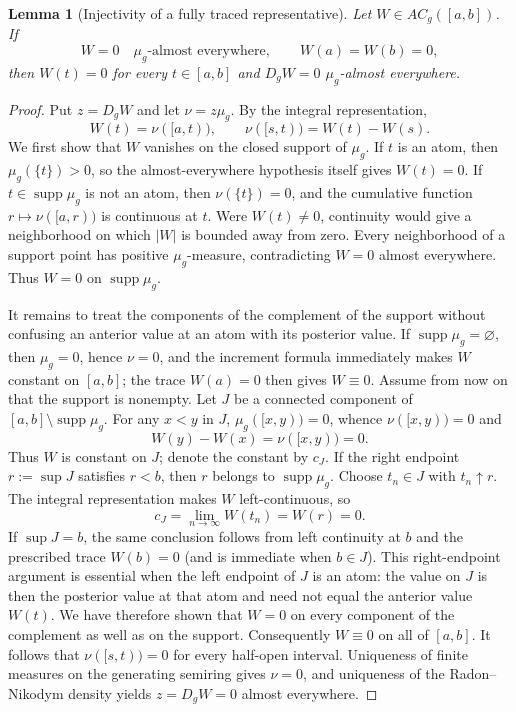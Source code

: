 \documentclass[preprint,12pt]{elsarticle}
\newenvironment{revision}{\begingroup\color{red}}{\endgroup}
\newenvironment{revision}{}{}
\newcommand{\newrev}[1]{{\color{red}#1}}
\newcommand{\newrev}[1]{#1}
\newtheorem{lemma}[theorem]{Lemma}
\theoremstyle{definition}
\theoremstyle{remark}
\begin{document}
\begin{revision}
\begin{lemma}[Injectivity of a fully traced representative]
\label{lem:traced-representative-injective}
Let \(W\in AC_g([a,b])\).  If
\[
 W=0\quad\mu_g\text{-almost everywhere},
 \qquad W(a)=W(b)=0,
\]
then \(W(t)=0\) for every \(t\in[a,b]\) and \(D_gW=0\)
\(\mu_g\)-almost everywhere.
\end{lemma}

\begin{proof}
Put \(z=D_gW\) and let \(\nu=z\mu_g\).  By the integral representation,
\[
 W(t)=\nu([a,t)),\qquad
 \nu([s,t))=W(t)-W(s).
\]
We first show that \(W\) vanishes on the closed support of \(\mu_g\).  If
\(t\) is an atom, then \(\mu_g(\{t\})>0\), so the almost-everywhere hypothesis
itself gives \(W(t)=0\).  If \(t\in\operatorname{supp}\mu_g\) is not an atom,
then \(\nu(\{t\})=0\), and the cumulative function
\(r\mapsto\nu([a,r))\) is continuous at \(t\).  Were \(W(t)\ne0\), continuity
would give a neighborhood on which \(|W|\) is bounded away from zero.  Every
neighborhood of a support point has positive \(\mu_g\)-measure, contradicting
\(W=0\) almost everywhere.  Thus \(W=0\) on \(\operatorname{supp}\mu_g\).

\newrev{It remains to treat the components of the complement of the support
without confusing an anterior value at an atom with its posterior value. If
$\operatorname{supp}\mu_g=\varnothing$, then $\mu_g=0$, hence $\nu=0$, and the
increment formula immediately makes $W$ constant on $[a,b]$; the trace
$W(a)=0$ then gives $W\equiv0$. Assume from now on that the support is
nonempty. Let $J$ be a connected component of
$[a,b]\setminus\operatorname{supp}\mu_g$. For any $x<y$ in $J$,
$\mu_g([x,y))=0$, whence $\nu([x,y))=0$ and
\[
 W(y)-W(x)=\nu([x,y))=0.
\]
Thus $W$ is constant on $J$; denote the constant by $c_J$. If the right
endpoint $r:=\sup J$ satisfies $r<b$, then $r$ belongs to
$\operatorname{supp}\mu_g$. Choose $t_n\in J$ with $t_n\uparrow r$. The
integral representation makes $W$ left-continuous, so
\[
 c_J=\lim_{n\to\infty}W(t_n)=W(r)=0.
\]
If $\sup J=b$, the same conclusion follows from left continuity at $b$ and
the prescribed trace $W(b)=0$ (and is immediate when $b\in J$). This
right-endpoint argument is essential when the left endpoint of $J$ is an atom:
the value on $J$ is then the posterior value at that atom and need not equal
the anterior value $W(t)$. We have therefore shown that $W=0$ on every
component of the complement as well as on the support. Consequently
$W\equiv0$ on all of $[a,b]$.}
It follows that \(\nu([s,t))=0\) for every half-open interval.  Uniqueness of
finite measures on the generating semiring gives \(\nu=0\), and uniqueness of
the Radon--Nikodym density yields \(z=D_gW=0\) almost everywhere.
\end{proof}
\end{revision}
\end{document}
